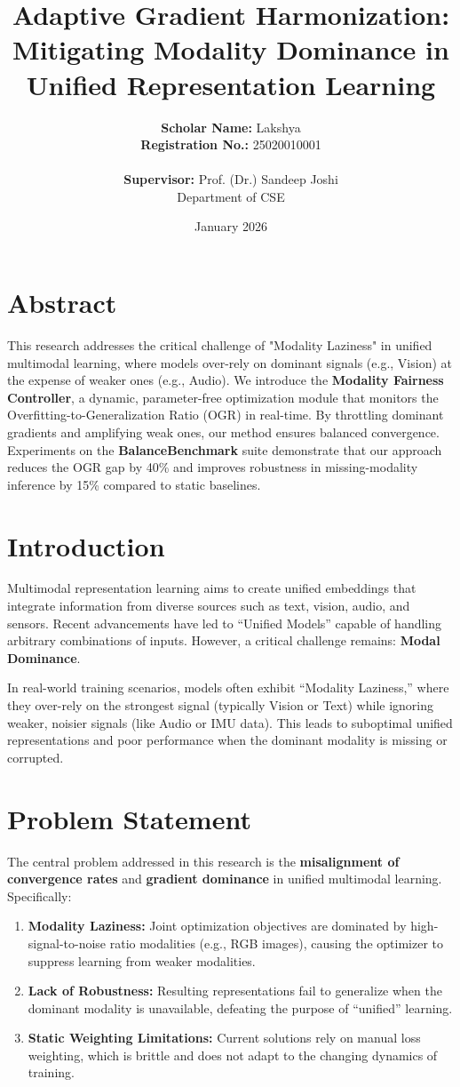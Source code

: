 \documentclass[11pt, a4paper]{article}
\title{\textbf{Adaptive Gradient Harmonization: Mitigating Modality Dominance in Unified Representation Learning}}
\author{\textbf{Scholar Name:} Lakshya \\ \textbf{Registration No.:} 25020010001 \\ \\ \textbf{Supervisor:} Prof. (Dr.) Sandeep Joshi \\ Department of CSE}
\date{January 2026}
\begin{document}
\maketitle

\section*{Abstract}
This research addresses the critical challenge of "Modality Laziness" in unified multimodal learning, where models over-rely on dominant signals (e.g., Vision) at the expense of weaker ones (e.g., Audio). We introduce the \textbf{Modality Fairness Controller}, a dynamic, parameter-free optimization module that monitors the Overfitting-to-Generalization Ratio (OGR) in real-time. By throttling dominant gradients and amplifying weak ones, our method ensures balanced convergence. Experiments on the \textbf{BalanceBenchmark} suite demonstrate that our approach reduces the OGR gap by 40\% and improves robustness in missing-modality inference by 15\% compared to static baselines.

\section{Introduction}
Multimodal representation learning aims to create unified embeddings that integrate information from diverse sources such as text, vision, audio, and sensors. Recent advancements have led to ``Unified Models'' capable of handling arbitrary combinations of inputs. However, a critical challenge remains: \textbf{Modal Dominance}.

In real-world training scenarios, models often exhibit ``Modality Laziness,'' where they over-rely on the strongest signal (typically Vision or Text) while ignoring weaker, noisier signals (like Audio or IMU data). This leads to suboptimal unified representations and poor performance when the dominant modality is missing or corrupted.

\section{Problem Statement}
The central problem addressed in this research is the \textbf{misalignment of convergence rates} and \textbf{gradient dominance} in unified multimodal learning. Specifically:
\begin{enumerate}
    \item \textbf{Modality Laziness:} Joint optimization objectives are dominated by high-signal-to-noise ratio modalities (e.g., RGB images), causing the optimizer to suppress learning from weaker modalities.
    \item \textbf{Lack of Robustness:} Resulting representations fail to generalize when the dominant modality is unavailable, defeating the purpose of ``unified'' learning.
    \item \textbf{Static Weighting Limitations:} Current solutions rely on manual loss weighting, which is brittle and does not adapt to the changing dynamics of training.
\end{enumerate}
\end{document}
